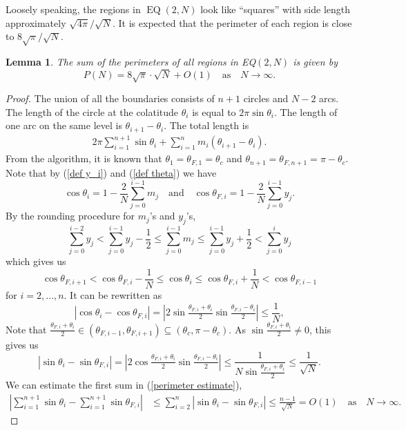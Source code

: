 \documentclass[a4paper,11pt]{amsart}
\newtheorem{lemma}{Lemma}
\begin{document}
Loosely speaking, the regions in $\operatorname{EQ}(2,N)$ look like ``squares'' with side length approximately $\sqrt{4\pi}/\sqrt {N}$. It is expected that the perimeter of each region is close to $8\sqrt{\pi}/\sqrt N$. 
\begin{lemma}\label{total perimeter}
    The sum of the perimeters of all regions in EQ$(2,N)$ is given by 
    $$P(N)=8\sqrt{\pi}\cdot\sqrt{N}+O(1) \quad \text{as}\quad N\rightarrow\infty.$$
\end{lemma}
\begin{proof}
    The union of all the boundaries consists of $n+1$ circles and $N-2$ arcs. The length of the circle at the colatitude $\theta_i$ is equal to $2\pi\sin\theta_i$. The length of one arc on the same level is $\theta_{i+1}-\theta_i$.
    The total length is 
\begin{align}\label{perimeter estimate}
    2\pi\sum\limits_{i=1}^{n+1}\sin\theta_i+\sum\limits_{i=1}^nm_i(\theta_{i+1}-\theta_i).
\end{align}
From the algorithm, it is known that $\theta_1=\theta_{F,1}=\theta_c$ and  $\theta_{n+1}=\theta_{F,n+1}=\pi-\theta_c$. Note that by (\ref{def y_i})  and (\ref{def theta}) we have 
$$\cos\theta_{i}=1-\frac{2}{N}\sum\limits_{j=0}^{i-1}m_j\quad \text{and} \quad \cos\theta_{F,i}=1-\frac{2}{N}\sum\limits_{j=0}^{i-1}y_j.$$
By the rounding procedure for $m_j$'s and $y_j$'s, 
$$\sum\limits_{j=0}^{i-2}y_j<\sum\limits_{j=0}^{i-1}y_j-\frac{1}{2}\leq \sum\limits_{j=0}^{i-1}m_j\leq \sum\limits_{j=0}^{i-1}y_j+\frac{1}{2}<\sum\limits_{j=0}^{i}y_j$$
which gives us 
$$\cos\theta_{F,i+1}<\cos\theta_{F,i}-\frac{1}{N}\leq \cos\theta_i\leq \cos \theta_{F,i}+\frac{1}{N}<\cos \theta_{F,i-1}$$
for $i=2,\dots ,n.$ It can be rewritten as 
$$|\cos\theta_i-\cos\theta_{F,i}|=\left|2\sin\tfrac{\theta_{F,i}+\theta_i}{2}\sin\tfrac{\theta_{F,i}-\theta_i}{2}\right|\leq \frac{1}{N},$$
Note that $\tfrac{\theta_{F,i}+\theta_i}{2}\in(\theta_{F,i-1},\theta_{F,i+1})\subseteq(\theta_c,\pi -\theta_c)$. As $\sin \tfrac{\theta_{F,i}+\theta_i}{2}\neq 0$, this gives us 
$$|\sin\theta_i-\sin\theta_{F,i}|=\left|2\cos\tfrac{\theta_{F,i}+\theta_i}{2}\sin\tfrac{\theta_{F,i}-\theta_i}{2}\right|\leq \frac{1}{N\sin\tfrac{\theta_{F,i}+\theta_i}{2}}\leq\frac{1}{\sqrt N}.$$
We can estimate the first sum in (\ref{perimeter estimate}),
\begin{align*}
    \left|\sum\limits_{i=1}^{n+1}\sin\theta_i-\sum\limits_{i=1}^{n+1}\sin\theta_{F,i}\right| &\leq \sum\limits_{i=2}^n\left|\sin\theta_i-\sin\theta_{F,i}\right|\leq \frac{n-1}{\sqrt N}=O(1) \quad \text{as}\quad N\rightarrow\infty.

\end{align*}
\end{proof}
\end{document}

